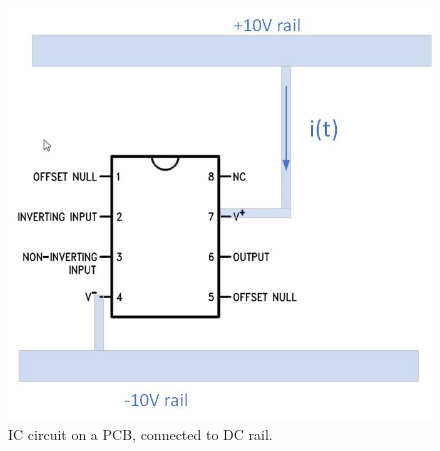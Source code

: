 \documentclass{ximera}
\begin{document}
\begin{figure}[htbp]
\begin{center}
\includegraphics[scale=0.5]{../jpg/ICcircuitWithRailandGround.jpg}
\end{center}
\caption{IC circuit on a PCB, connected to DC rail.}
\label{fig:VoltageDroop}
\end{figure}







\end{document}
